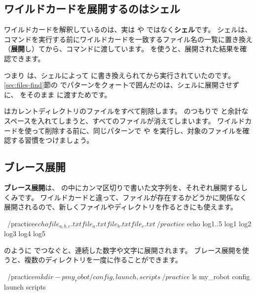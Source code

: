 \subsection{ワイルドカードを展開するのはシェル}

ワイルドカードを解釈しているのは、実は  や  ではなく\textbf{シェル}です。
シェルは、コマンドを実行する前にワイルドカードを一致するファイル名の一覧に置き換え（\textbf{展開}し）てから、コマンドに渡しています。
 を使うと、展開された結果を確認できます。


つまり  は、シェルによって  に書き換えられてから実行されていたのです。
\ref{sec:files-find}節の  でパターンをクォートで囲んだのは、シェルに展開させずに、\cmd{*} をそのまま  に渡すためです。

\begin{caution}[rm とワイルドカード]
   はカレントディレクトリのファイルをすべて削除します。
   のつもりで  と余計なスペースを入れてしまうと、すべてのファイルが消えてしまいます。
  ワイルドカードを使って削除する前に、同じパターンで  や  を実行し、対象のファイルを確認する習慣をつけましょう。
\end{caution}

\subsection{ブレース展開}

\textbf{ブレース展開}は、\cmd{\{ \}} の中にカンマ区切りで書いた文字列を、それぞれ展開するしくみです。
ワイルドカードと違って、ファイルが存在するかどうかに関係なく展開されるので、新しくファイルやディレクトリを作るときにも使えます。

\begin{terminal}[ブレース展開]
~/practice$ echo file_{a,b,c}.txt
file_a.txt file_b.txt file_c.txt
~/practice$ echo log{1..5}
log1 log2 log3 log4 log5
\end{terminal}

 のように  でつなぐと、連続した数字や文字に展開されます。
ブレース展開を使うと、複数のディレクトリを一度に作ることができます。

\begin{terminal}[複数のディレクトリを一度に作る]
~/practice$ mkdir -p my_robot/{config,launch,scripts}
~/practice$ ls my_robot
config  launch  scripts
\end{terminal}

